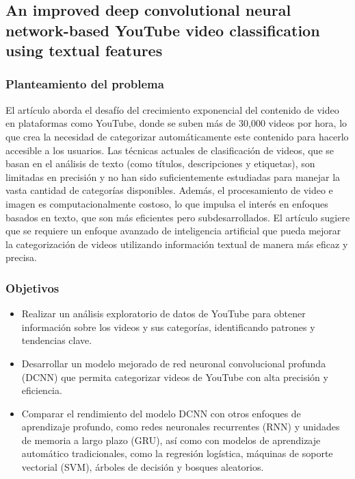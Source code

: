 \subsection{An improved deep convolutional neural network-based YouTube video classification using textual features}
\cite{raza2024improved}
\subsubsection{Planteamiento del problema}
El artículo aborda el desafío del crecimiento exponencial del contenido de video en plataformas como YouTube, donde se suben más de 30,000 videos por hora, lo que crea la necesidad de categorizar automáticamente este contenido para hacerlo accesible a los usuarios. Las técnicas actuales de clasificación de videos, que se basan en el análisis de texto (como títulos, descripciones y etiquetas), son limitadas en precisión y no han sido suficientemente estudiadas para manejar la vasta cantidad de categorías disponibles. Además, el procesamiento de video e imagen es computacionalmente costoso, lo que impulsa el interés en enfoques basados en texto, que son más eficientes pero subdesarrollados. El artículo sugiere que se requiere un enfoque avanzado de inteligencia artificial que pueda mejorar la categorización de videos utilizando información textual de manera más eficaz y precisa.
\subsubsection{Objetivos}
\begin{itemize}
	\item Realizar un análisis exploratorio de datos de YouTube para obtener información sobre los videos y sus categorías, identificando patrones y tendencias clave.
	\item Desarrollar un modelo mejorado de red neuronal convolucional profunda (DCNN) que permita categorizar videos de YouTube con alta precisión y eficiencia.
	\item Comparar el rendimiento del modelo DCNN con otros enfoques de aprendizaje profundo, como redes neuronales recurrentes (RNN) y unidades de memoria a largo plazo (GRU), así como con modelos de aprendizaje automático tradicionales, como la regresión logística, máquinas de soporte vectorial (SVM), árboles de decisión y bosques aleatorios.
\end{itemize}

